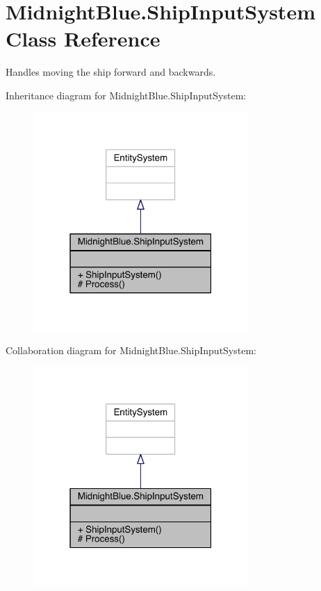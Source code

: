 \hypertarget{class_midnight_blue_1_1_ship_input_system}{}\section{Midnight\+Blue.\+Ship\+Input\+System Class Reference}
\label{class_midnight_blue_1_1_ship_input_system}


Handles moving the ship forward and backwards.  




Inheritance diagram for Midnight\+Blue.\+Ship\+Input\+System\+:
\nopagebreak
\begin{figure}[H]
\begin{center}
\leavevmode
\includegraphics[width=232pt]{class_midnight_blue_1_1_ship_input_system__inherit__graph}
\end{center}
\end{figure}


Collaboration diagram for Midnight\+Blue.\+Ship\+Input\+System\+:
\nopagebreak
\begin{figure}[H]
\begin{center}
\leavevmode
\includegraphics[width=232pt]{class_midnight_blue_1_1_ship_input_system__coll__graph}
\end{center}
\end{figure}
